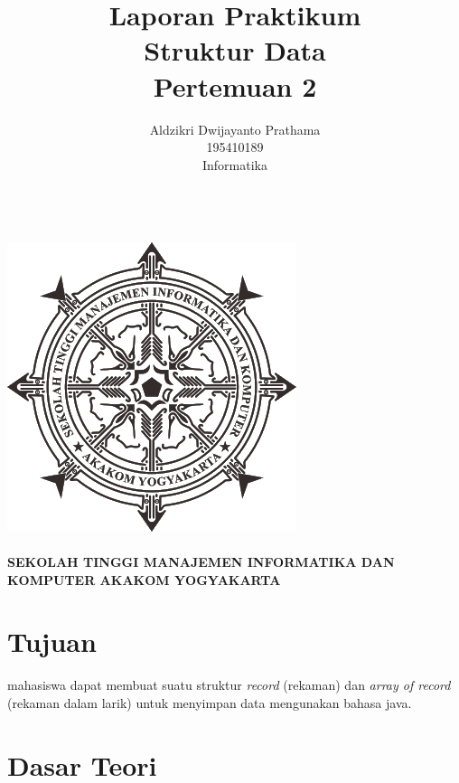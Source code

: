 \documentclass[a4paper,12pt]{article}
\begin{document}
\title{ {\Large Laporan Praktikum}\\ Struktur Data\\{\Large Pertemuan 2}}

\author{Aldzikri Dwijayanto Prathama
    \\195410189
    \\Informatika}
\makeatletter
\begin{titlepage}
    \begin{center}
        {\huge \bfseries \@title}\\[14ex]
        \includegraphics[scale=.8]{logo}\\[4ex]
        {\large \@author}\\[12ex]
        {\large \bfseries {SEKOLAH TINGGI MANAJEMEN INFORMATIKA DAN KOMPUTER
            AKAKOM YOGYAKARTA}}
    \end{center}


\end{titlepage}
\makeatother
\newpage
\tableofcontents
\newpage

\section{Tujuan}
mahasiswa dapat membuat suatu struktur \textit{record} (rekaman) dan \textit{array of record}
(rekaman dalam larik) untuk menyimpan data mengunakan bahasa java.
\section{Dasar Teori}
 
\end{document}
